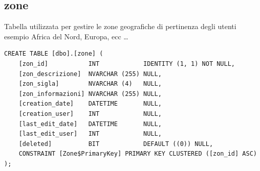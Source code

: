 \documentclass[12pt]{article}
\begin{document}
\subsection{zone}
Tabella utilizzata per gestire le zone geografiche di pertinenza degli utenti esempio Africa del Nord, Europa, ecc \dots
\begin{lstlisting}
CREATE TABLE [dbo].[zone] (
    [zon_id]           INT            IDENTITY (1, 1) NOT NULL,
    [zon_descrizione]  NVARCHAR (255) NULL,
    [zon_sigla]        NVARCHAR (4)   NULL,
    [zon_informazioni] NVARCHAR (255) NULL,
    [creation_date]    DATETIME       NULL,
    [creation_user]    INT            NULL,
    [last_edit_date]   DATETIME       NULL,
    [last_edit_user]   INT            NULL,
    [deleted]          BIT            DEFAULT ((0)) NULL,
    CONSTRAINT [Zone$PrimaryKey] PRIMARY KEY CLUSTERED ([zon_id] ASC)
);
\end{lstlisting}
\end{document}
